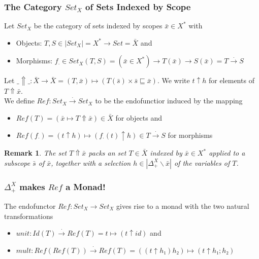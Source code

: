 \documentclass[aspectratio=169]{beamer}
\theoremstyle{remarkstyle}
\newtheorem*{remark}{Remark}
\begin{document}
\begin{frame}[fragile]
  \frametitle{The Category $Set_X$ of Sets Indexed by Scope}
  \begin{definition}
    Let $Set_X$ be the category of sets indexed by scopes $\bar{x} ∈ X^*$ with
    \begin{itemize}
      \item Objects: $T, S ∈ |Set_X| = X^* → Set = \bar{X}$ and 
      \item Morphisms: $f_⋅ ∈ Set_X(T, S) = (\bar{x}∈X^*) → T(\bar{x}) → S(\bar{x}) = T \stackrel{⋅}{→} S$
    \end{itemize}
  \end{definition}
  \begin{definition}
    Let $\_⇑\_ : \bar{X} → \bar{X} = (T, \bar{x}) ↦ (T(\bar{s}) × \bar{s} ⊑ \bar{x})$. We write $t ↑ h$ for elements of  $T ⇑ \bar{x}$. 
    \\We define $Ref : Set_X \stackrel{⋅}{→} Set_X$ to be the endofunctior induced by the mapping
    \begin{itemize}
      \item $Ref(T) = (\bar{x} ↦ T ⇑ \bar{x}) ∈ \bar{X}$ for objects and
      \item $Ref(f_⋅) = (t ↑ h) ↦ (f_⋅(t) ↑ h) ∈ T \stackrel{⋅}{→} S$ for morphisms
    \end{itemize}
  \end{definition}
  \begin{remark}
    The set $T⇑\bar{x}$ packs an set $T ∈ \bar{X}$ indexed by $\bar{x} ∈ X^*$ applied to a subscope $\bar{s}$ of $\bar{x}$, together with a selection $h ∈ |Δ_+^X∖\bar{x}|$ of the variables of $T$.
  \end{remark}
\end{frame}

\begin{frame}[fragile]
  \frametitle{$Δ_+^X$ makes $Ref$ a Monad!}
  \begin{theorem}
    The endofunctor $Ref : Set_X → Set_X$ gives rise to a monad with the two natural transformations
    \begin{itemize}
      \item $unit : Id(T) \stackrel{⋅}{→} Ref(T) = t ↦ (t ↑ id)$ and
      \item $mult : Ref(Ref(T)) \stackrel{⋅}{→} Ref(T) = ((t ↑ h₁) h₂) ↦ (t ↑ h₁;h₂)$
    \end{itemize}
  \end{theorem}
  \begin{example}
  \end{example}
\end{frame}
\end{document}
